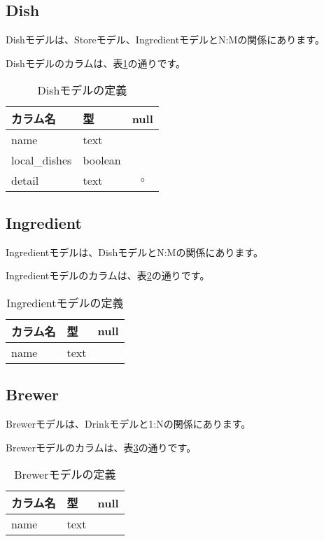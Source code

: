 \documentclass[a4j,titlepage]{jarticle}
\begin{document}
\subsection{Dish}
Dishモデルは、Storeモデル、IngredientモデルとN:Mの関係にあります。

Dishモデルのカラムは、表\ref{dish}の通りです。

\begin{table}[!htbp]
\caption{Dishモデルの定義}
\label{dish}
\small
\begin{center}
\begin{tabular}{|l|l|c|}\hline
カラム名 & 型 & null \\\hline\hline
name & text & \\\hline
local\_dishes & boolean & \\\hline
detail & text & $\circ$ \\\hline
\end{tabular}
\end{center}
\end{table}

\subsection{Ingredient}
Ingredientモデルは、DishモデルとN:Mの関係にあります。

Ingredientモデルのカラムは、表\ref{ingredient}の通りです。

\begin{table}[!htbp]
\caption{Ingredientモデルの定義}
\label{ingredient}
\small
\begin{center}
\begin{tabular}{|l|l|c|}\hline
カラム名 & 型 & null \\\hline\hline
name & text & \\\hline
\end{tabular}
\end{center}
\end{table}

\subsection{Brewer}
Brewerモデルは、Drinkモデルと1:Nの関係にあります。

Brewerモデルのカラムは、表\ref{brewer}の通りです。

\begin{table}[!htbp]
\caption{Brewerモデルの定義}
\label{brewer}
\small
\begin{center}
\begin{tabular}{|l|l|c|}\hline
カラム名 & 型 & null \\\hline\hline
name & text & \\\hline
\end{tabular}
\end{center}
\end{table}
\end{document}
